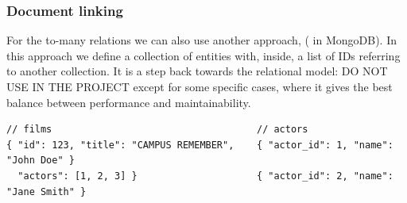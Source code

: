 \subsubsection{Document linking}
For the to-many relations we can also use another approach,  ( in MongoDB). In this approach we define a collection of entities with, inside, a list of IDs referring to another collection. It is a step back towards the relational model: DO NOT USE IN THE PROJECT except for some specific cases, where it gives the best balance between performance and maintainability.
\begin{lstlisting}
// films                                    // actors
{ "id": 123, "title": "CAMPUS REMEMBER",    { "actor_id": 1, "name": "John Doe" }
  "actors": [1, 2, 3] }                     { "actor_id": 2, "name": "Jane Smith" }
\end{lstlisting}

